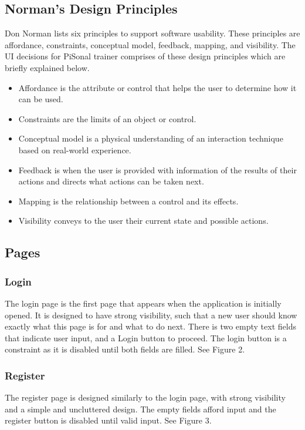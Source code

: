\documentclass{article}
\begin{document}
\subsection{Norman’s Design Principles}
Don Norman lists six principles to support software usability. These principles are affordance, constraints, conceptual model, feedback, mapping, and visibility\cite{norman}. The UI decisions for PiSonal trainer comprises of these design principles which are briefly explained below. 
\begin{itemize}
    \item Affordance is the attribute or control that helps the user to determine how it can be used\cite{norman}.
    \item Constraints are the limits of an object or control\cite{norman}.
    \item Conceptual model is a physical understanding of an interaction technique based on real-world experience\cite{norman}. 
    \item Feedback is when the user is provided with information of the results of their actions and directs what actions can be taken next\cite{norman}.   
    \item Mapping is the relationship between a control and its effects\cite{norman}.
    \item Visibility conveys to the user their current state and possible actions\cite{norman}.
\end{itemize}

\newpage
\subsection{Pages}
\subsubsection{Login}
The login page is the first page that appears when the application is initially opened. It is designed to have strong visibility, such that a new user should know exactly what this page is for and what to do next. There is two empty text fields that indicate user input, and a Login button to proceed. The login button is a constraint as it is disabled until both fields are filled. See Figure 2.

\subsubsection{Register}
The register page is designed similarly to the login page, with strong visibility and a simple and uncluttered design. The empty fields afford input and the register button is disabled until valid input. See Figure 3.
\end{document}
